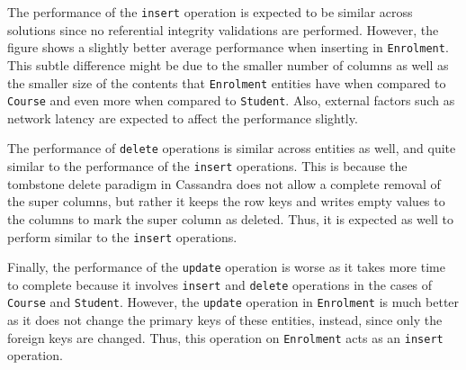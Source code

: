 The performance of the  \texttt{insert} operation is expected to be similar
across solutions since no referential integrity validations are performed. However, the figure
shows a slightly  better average performance when inserting in
\texttt{Enrolment}. This subtle difference might be due to the smaller number of
columns as well as the smaller size of the contents that \texttt{Enrolment}
entities have when compared to \texttt{Course} and even more when compared to
\texttt{Student}. Also, external factors such as network latency are expected to
affect the performance slightly.

The performance of \texttt{delete} operations is similar across entities as
well, and quite similar to the performance of the \texttt{insert} operations.
This is because the tombstone delete paradigm in Cassandra does not allow a
complete removal of the super columns, but rather it keeps the row keys and
writes empty values to the columns to mark the super column as deleted. Thus, it
is expected as well to perform similar to the \texttt{insert} operations.


Finally, the performance of the \texttt{update} operation is worse
as it takes more time to complete because it involves  \texttt{insert} and
\texttt{delete} operations in the cases of \texttt{Course} and
\texttt{Student}. However, the \texttt{update} operation in \texttt{Enrolment}
is much better as it does not change the primary keys of these entities,
instead, since only the foreign keys are changed. Thus, this operation on
\texttt{Enrolment} acts as an \texttt{insert} operation.


